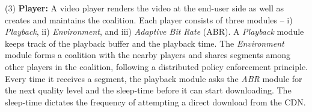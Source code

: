 \noindent (3) {\bf Player:} A video player renders the video at the end-user side as well as creates and maintains the coalition. Each player consists of three modules -- i) \textit{Playback}, ii) \textit{Environment}, and iii) \textit{Adaptive Bit Rate} (ABR). A {\it Playback} module keeps track of the playback buffer and the playback time. The {\it Environment} module forms a coalition with the nearby players and shares segments among other players in the coalition, following a distributed policy enforcement principle.
Every time it receives a segment, the playback module asks the {\it ABR} module for the next quality level and the sleep-time before it can start downloading. The sleep-time dictates the frequency of attempting a direct download from the CDN. 






